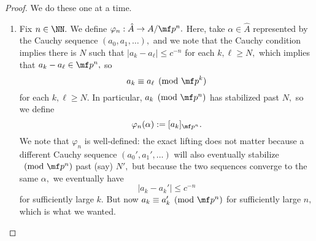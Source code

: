 \begin{proof}
	We do these one at a time.
	\begin{enumerate}[label=(\alph*)]
		\item Fix $n\in\NN.$ We define $\varphi_n:\hat A\to A/\mf p^n.$ Here, take $\alpha\in\hat A$ represented by the Cauchy sequence $(a_0,a_1,\ldots),$ and we note that the Cauchy condition implies there is $N$ such that $|a_k-a_\ell|\le c^{-n}$ for each $k,\ell\ge N,$ which implies that $a_k-a_\ell\in\mf p^n,$ so
		\[a_k\equiv a_\ell\pmod{\mf p^k}\]
		for each $k,\ell\ge N.$ In particular, $a_k\pmod{\mf p^n}$ has stabilized past $N,$ so we define
		\[\varphi_n(\alpha):=[a_k]_{\mf p^n}.\]
		We note that $\varphi_n$ is well-defined: the exact lifting does not matter because a different Cauchy sequence $(a_0',a_1',\ldots)$ will also eventually stabilize$\pmod{\mf p^n}$ past (say) $N',$ but because the two sequences converge to the same $\alpha,$ we eventually have
		\[|a_k-a_k'|\le c^{-n}\]
		for sufficiently large $k.$ But now $a_k\equiv a_k'\pmod{\mf p^n}$ for sufficiently large $n,$ which is what we wanted.


\end{enumerate}
\end{proof}
